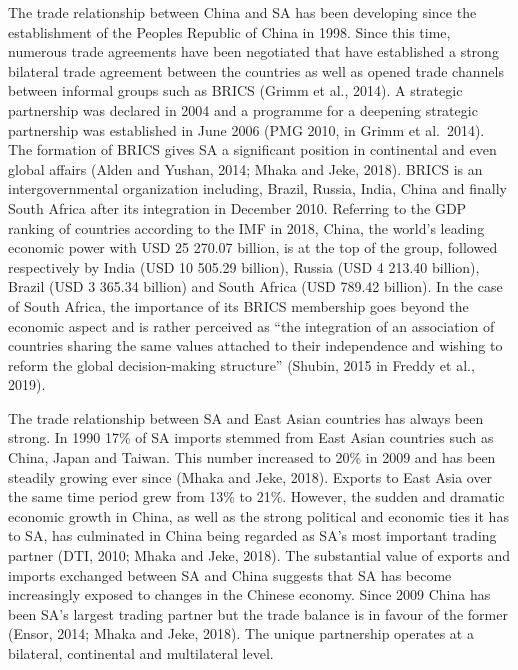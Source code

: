 \documentclass[11pt,preprint, authoryear]{elsarticle}
\numberwithin{equation}{section}
\numberwithin{figure}{section}
\numberwithin{table}{section}
\begin{document}
The trade relationship between China and SA has been developing since
the establishment of the Peoples Republic of China in 1998. Since this
time, numerous trade agreements have been negotiated that have
established a strong bilateral trade agreement between the countries as
well as opened trade channels between informal groups such as BRICS
(Grimm et al., 2014). A strategic partnership was declared in 2004 and a
programme for a deepening strategic partnership was established in June
2006 (PMG 2010, in Grimm et al.~2014). The formation of BRICS gives SA a
significant position in continental and even global affairs (Alden and
Yushan, 2014; Mhaka and Jeke, 2018). BRICS is an intergovernmental
organization including, Brazil, Russia, India, China and finally South
Africa after its integration in December 2010. Referring to the GDP
ranking of countries according to the IMF in 2018, China, the world's
leading economic power with USD 25 270.07 billion, is at the top of the
group, followed respectively by India (USD 10 505.29 billion), Russia
(USD 4 213.40 billion), Brazil (USD 3 365.34 billion) and South Africa
(USD 789.42 billion). In the case of South Africa, the importance of its
BRICS membership goes beyond the economic aspect and is rather perceived
as ``the integration of an association of countries sharing the same
values attached to their independence and wishing to reform the global
decision-making structure'' (Shubin, 2015 in Freddy et al., 2019).

The trade relationship between SA and East Asian countries has always
been strong. In 1990 17\% of SA imports stemmed from East Asian
countries such as China, Japan and Taiwan. This number increased to 20\%
in 2009 and has been steadily growing ever since (Mhaka and Jeke, 2018).
Exports to East Asia over the same time period grew from 13\% to 21\%.
However, the sudden and dramatic economic growth in China, as well as
the strong political and economic ties it has to SA, has culminated in
China being regarded as SA's most important trading partner (DTI, 2010;
Mhaka and Jeke, 2018). The substantial value of exports and imports
exchanged between SA and China suggests that SA has become increasingly
exposed to changes in the Chinese economy. Since 2009 China has been
SA's largest trading partner but the trade balance is in favour of the
former (Ensor, 2014; Mhaka and Jeke, 2018). The unique partnership
operates at a bilateral, continental and multilateral level.
\end{document}
